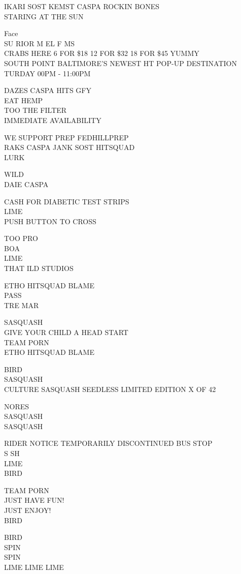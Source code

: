 \documentclass[10pt,letterpaper]{article}
\begin{document}
IKARI SOST KEMST CASPA ROCKIN BONES\\
STARING AT THE SUN

Face\\
SU RIOR M EL F MS\\
CRABS HERE 6 FOR \$18 12 FOR \$32 18 FOR \$45 YUMMY\\
SOUTH POINT BALTIMORE'S NEWEST HT POP{-}UP DESTINATION TURDAY 00PM {-} 11:00PM

DAZES CASPA HITS GFY\\
EAT HEMP\\
TOO THE FILTER\\
IMMEDIATE AVAILABILITY

WE SUPPORT PREP FEDHILLPREP\\
RAKS CASPA JANK SOST HITSQUAD\\
LURK

WILD\\
DAIE CASPA

CASH FOR DIABETIC TEST STRIPS\\
LIME\\
PUSH BUTTON TO CROSS

TOO PRO\\
BOA\\
LIME\\
THAT ILD STUDIOS

ETHO HITSQUAD BLAME\\
PASS\\
TRE MAR

SASQUASH\\
GIVE YOUR CHILD A HEAD START\\
TEAM PORN\\
ETHO HITSQUAD BLAME

BIRD\\
SASQUASH\\
CULTURE SASQUASH SEEDLESS LIMITED EDITION X OF 42

NORES\\
SASQUASH\\
SASQUASH

RIDER NOTICE TEMPORARILY DISCONTINUED BUS STOP\\
S SH\\
LIME\\
BIRD

TEAM PORN\\
JUST HAVE FUN!\\
JUST ENJOY!\\
BIRD

BIRD\\
SPIN\\
SPIN\\
LIME LIME LIME
\end{document}
